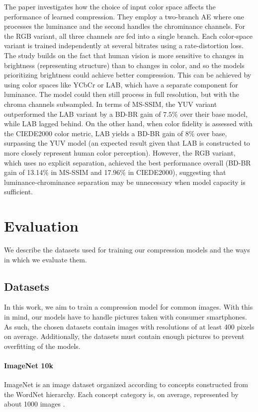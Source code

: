 \documentclass[conference]{IEEEtran}
\begin{document}
The paper \cite{prativadibhayankaram_study_2024} investigates how the choice of input color space affects the performance of learned compression. They employ a two-branch AE where one processes the luminance and the second handles the chrominance channels. For the RGB variant, all three channels are fed into a single branch. Each color-space variant is trained independently at several bitrates using a rate-distortion loss. The study builds on the fact that human vision is more sensitive to changes in brightness (representing structure) than to changes in color, and so the models prioritizing brightness could achieve better compression. This can be achieved by using color spaces like YCbCr or LAB, which have a separate component for luminance. The model could then still process in full resolution, but with the chroma channels subsampled. In terms of MS-SSIM, the YUV variant outperformed the LAB variant by a BD-BR gain of $7.5\%$ over their base model, while LAB lagged behind. On the other hand, when color fidelity is assessed with the CIEDE2000 color metric, LAB yields a BD-BR gain of $8\%$ over base, surpassing the YUV model (an expected result given that LAB is constructed to more closely represent human color perception). However, the RGB variant, which uses no explicit separation, achieved the best performance overall (BD-BR gain of 13.14\% in MS-SSIM and 17.96\% in CIEDE2000), suggesting that luminance-chrominance separation may be unnecessary when model capacity is sufficient.


\section{Evaluation}
We describe the datasets used for training our compression models and the ways in which we evaluate them.

\subsection{Datasets}
In this work, we aim to train a compression model for common images. With this in mind, our models have to handle pictures taken with consumer smartphones. As such, the chosen datasets contain images with resolutions of at least 400 pixels on average. Additionally, the datasets must contain enough pictures to prevent overfitting of the models.

\paragraph{ImageNet 10k}
ImageNet is an image dataset organized according to concepts constructed from the WordNet hierarchy. Each concept category is, on average, represented by about 1000 images \cite{noauthor_imagenet_nodate-1}.
\end{document}
